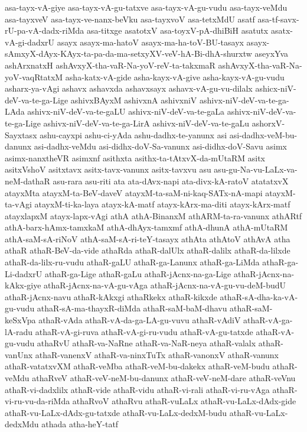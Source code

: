 {asa-tayx-vA-giye
asa-tayx-vA-gu-tatxve
asa-tayx-vA-gu-vudu
asa-tayx-veMdu
asa-tayxveV
asa-tayx-ve-nanx-beVku
asa-tayxvoV
asa-tetxMdU
asatf
asa-tf-savx-rU-pa-vA-dadx-riMda
asa-titxge
asatotxV
asa-toyxV-pA-dhiBiH
asatutx
asatx-vA-gi-dadxrU
asayx
asayx-ma-hatoV
asayx-ma-ha-toV-BU-tasayx
asayx-sAmxyX-dAyx-KAyx-ta-pa-da-ma-setxyXV-veV-hA-Bi-dhA-shurxtw
aseyxYva
ashArxnatxH
ashAvxyX-tha-vaR-Na-yoV-reV-ta-takxmaR
ashAvxyX-tha-vaR-Na-yoV-vaqRtatxM
asha-katx-vA-gide
asha-kayx-vA-give
asha-kayx-vA-gu-vudu
asharx-ya-vAgi
ashavx
ashavxda
ashavxsayx
ashavx-vA-gu-vu-dilalx
ashicx-niV-deV-va-te-ga-Lige
ashivxBAyxM
ashivxnA
ashivxniV
ashivx-niV-deV-va-te-ga-LAda
ashivx-niV-deV-va-te-gaLU
ashivx-niV-deV-va-te-gaLa
ashivx-niV-deV-va-te-ga-Lige
ashivx-niV-deV-va-te-ga-LirA
ashivx-niV-deV-va-te-gaLu
ashorxV-Sayxtasx
ashu-cayxpi
ashu-ci-yAda
ashu-dadhx-te-yanunx
asi
asi-dadhx-veM-bu-danunx
asi-dadhx-veMdu
asi-didhx-doV-Sa-vanunx
asi-didhx-doV-Savu
asimx
asimx-nanxtheVR
asimxnf
asithxta
asithx-ta-tAtxvX-da-mUtaRM
asitx
asitxVshoV
asitxtavx
asitx-tavx-vanunx
asitx-tavxvu
asu
asu-gu-Na-vu-LaLx-va-neM-dathaR
asu-rara
asu-riti
ata
ata-dAvx-napi
ata-divx-kA-ratoV
atatatxvX
atayxMta
atayxM-ta-BeV-daveV
atayxM-ta-saM-ni-kaq-SATx-nA-mapi
atayxM-ta-vAgi
atayxM-ti-ka-laya
atayx-kA-matf
atayx-kArx-ma-diti
atayx-kArx-matf
atayxlapxM
atayx-lapx-vAgi
athA
athA-BinanxM
athARM-ta-ra-vanunx
athARtf
athA-barx-hAmx-tamxkaM
athA-dhAyx-tamxmf
athA-dhunA
athA-mUtaRM
athA-saM-sA-riNoV
athA-saM-sA-ri-teY-tasayx
athAta
athAtoV
athAvA
atha
athaR
athaR-BeV-da-vide
athaRda
athaR-dalUlx
athaR-dalilx
athaR-da-lilxde
athaR-da-lilx-ru-vudu
athaR-gaLU
athaR-ga-Lanunx
athaR-ga-LiMda
athaR-ga-Li-dadxrU
athaR-ga-Lige
athaR-gaLu
athaR-jAcnx-na-ga-Lige
athaR-jAcnx-na-kAkx-giye
athaR-jAcnx-na-vA-gu-vAga
athaR-jAcnx-na-vA-gu-vu-deM-budU
athaR-jAcnx-navu
athaR-kAkxgi
athaRkekx
athaR-kikxde
athaR-sA-dha-ka-vA-gu-vudu
athaR-sA-ma-thayxR-diMda
athaR-saM-baM-dhavu
athaR-saM-keSxVpa
athaR-vAda
athaR-vA-da-ga-LA-gu-vuvu
athaR-vAdiV
athaR-vA-ga-lA-radu
athaR-vA-gi-ruva
athaR-vA-gi-ru-vudu
athaR-vA-gu-tatxde
athaR-vA-gu-vudu
athaRvU
athaR-va-NaRne
athaR-va-NaR-neya
athaR-valalx
athaR-vanUnx
athaR-vanenxV
athaR-va-ninxTuTx
athaR-vanonxV
athaR-vanunx
athaR-vatatxvXM
athaR-veMba
athaR-veM-bu-dakekx
athaR-veM-budu
athaR-veMdu
athaRveV
athaR-veV-neM-bu-danunx
athaR-veV-neM-dare
athaR-veVnu
athaR-vi-dadxlilx
athaR-vide
athaR-vidu
athaR-vi-rali
athaR-vi-ru-vAga
athaR-vi-ru-vu-da-riMda
athaRvoV
athaRvu
athaR-vuLaLx
athaR-vu-LaLx-dAdx-gide
athaR-vu-LaLx-dAdx-gu-tatxde
athaR-vu-LaLx-dedxM-budu
athaR-vu-LaLx-dedxMdu
athada
atha-heY-tatf
}

